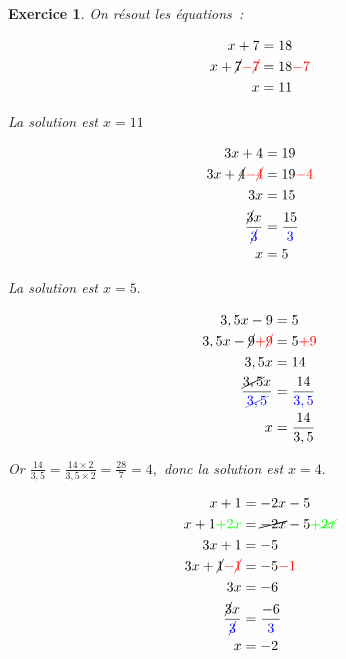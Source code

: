 \documentclass[10pt]{article}
\newtheorem{exo}{Exercice}
\begin{document}
\begin{exo}


On résout les équations~:

\setlength{\columnseprule}{1pt}
\begin{multicols}{5}
\begin{align*}
x+7&=18\\
x+\cancel{7}\textcolor{red}{-\cancel{7}}&=18\textcolor{red}{-7}\\
x&=11
\end{align*}

La solution est $x=11$

\columnbreak

\begin{align*}
3x+4&=19\\
3x+\cancel{4}\textcolor{red}{-\cancel{4}}&=19\textcolor{red}{-4}\\
3x&=15\\
\frac{\cancel{3}x}{\textcolor{blue}{\cancel{3}}}&=\frac{15}{\textcolor{blue}{3}}\\
x&=5
\end{align*}

La solution est $x=5.$

\columnbreak

\begin{align*}
3,5x-9&=5\\
3,5x-\cancel{9}\textcolor{red}{+\cancel{9}}&=5\textcolor{red}{+9}\\
3,5x&=14\\
\frac{\cancel{3,5}x}{\textcolor{blue}{\cancel{3,5}}}&=\frac{14}{\textcolor{blue}{3,5}}\\
x&=\frac{14}{3,5}
\end{align*}

Or $\frac{14}{3,5}=\frac{14\times 2}{3,5\times 2}=\frac{28}{7}=4,$ donc la solution est $x=4.$

 
 \columnbreak
 
 \begin{align*}
x+1&=-2x-5\\
x+1\textcolor{green}{+2x}&=\cancel{-2x}-5\textcolor{green}{+\cancel{2x}}\\
3x+1&=-5\\
3x+\cancel{1}\textcolor{red}{-\cancel{1}}&=-5\textcolor{red}{-{1}}\\
3x&=-6\\
\frac{\cancel{3}x}{\textcolor{blue}{\cancel{3}}}&=\frac{-6}{\textcolor{blue}{3}}\\
x&=-2
\end{align*}


\end{multicols}
\end{exo}
\end{document}
